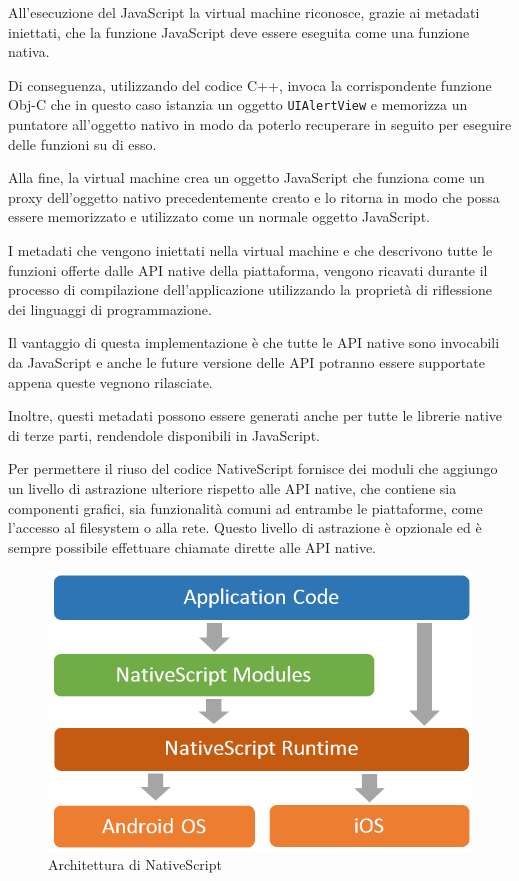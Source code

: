 All'esecuzione del JavaScript la virtual machine riconosce, grazie ai metadati iniettati, che la funzione JavaScript deve essere eseguita come una funzione nativa.

Di conseguenza, utilizzando del codice C++, invoca la corrispondente funzione Obj-C che in questo caso istanzia un oggetto \texttt{UIAlertView} e memorizza un puntatore all'oggetto nativo in modo da poterlo recuperare in seguito per eseguire delle funzioni su di esso.

Alla fine, la virtual machine crea un oggetto JavaScript che funziona come un proxy dell'oggetto nativo precedentemente creato e lo ritorna in modo che possa essere memorizzato e utilizzato come un normale oggetto JavaScript.

I metadati che vengono iniettati nella virtual machine e che descrivono tutte le funzioni offerte dalle API native della piattaforma, vengono ricavati durante il processo di compilazione dell'applicazione utilizzando la proprietà di \gls{riflessione} dei linguaggi di programmazione.

Il vantaggio di questa implementazione è che tutte le API native sono invocabili da JavaScript e anche le future versione delle API potranno essere supportate appena queste vegnono rilasciate.

Inoltre, questi metadati possono essere generati anche per tutte le librerie native di terze parti, rendendole disponibili in JavaScript.

Per permettere il riuso del codice NativeScript fornisce dei moduli che aggiungo un livello di astrazione ulteriore rispetto alle API native, che contiene sia componenti grafici, sia funzionalità comuni ad entrambe le piattaforme, come l'accesso al filesystem o alla rete.
Questo livello di astrazione è opzionale ed è sempre possibile effettuare chiamate dirette alle API native.

\begin{figure}[htp]
\centering
\includegraphics[width=\textwidth/2]{../immagini/ns-architecture}
\caption{Architettura di NativeScript}  
\end{figure}
\FloatBarrier

